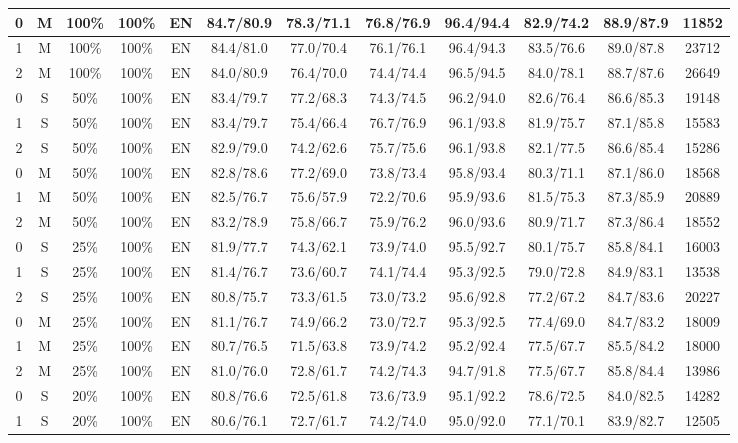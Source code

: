 \begin{table*}
{\begin{tabular}{|c|c|c|c|c||c|c|c|c|c|c||c|}
0 & M & 100\% & 100\% & EN & 84.7/80.9 & 78.3/71.1 & 76.8/76.9 & 96.4/94.4 & 82.9/74.2 & 88.9/87.9 & 11852 \\ \hline
1 & M & 100\% & 100\% & EN & 84.4/81.0 & 77.0/70.4 & 76.1/76.1 & 96.4/94.3 & 83.5/76.6 & 89.0/87.8 & 23712 \\ \hline
2 & M & 100\% & 100\% & EN & 84.0/80.9 & 76.4/70.0 & 74.4/74.4 & 96.5/94.5 & 84.0/78.1 & 88.7/87.6 & 26649 \\ \hline
0 & S & 50\% & 100\% & EN & 83.4/79.7 & 77.2/68.3 & 74.3/74.5 & 96.2/94.0 & 82.6/76.4 & 86.6/85.3 & 19148 \\ \hline
1 & S & 50\% & 100\% & EN & 83.4/79.7 & 75.4/66.4 & 76.7/76.9 & 96.1/93.8 & 81.9/75.7 & 87.1/85.8 & 15583 \\ \hline
2 & S & 50\% & 100\% & EN & 82.9/79.0 & 74.2/62.6 & 75.7/75.6 & 96.1/93.8 & 82.1/77.5 & 86.6/85.4 & 15286 \\ \hline
0 & M & 50\% & 100\% & EN & 82.8/78.6 & 77.2/69.0 & 73.8/73.4 & 95.8/93.4 & 80.3/71.1 & 87.1/86.0 & 18568 \\ \hline
1 & M & 50\% & 100\% & EN & 82.5/76.7 & 75.6/57.9 & 72.2/70.6 & 95.9/93.6 & 81.5/75.3 & 87.3/85.9 & 20889 \\ \hline
2 & M & 50\% & 100\% & EN & 83.2/78.9 & 75.8/66.7 & 75.9/76.2 & 96.0/93.6 & 80.9/71.7 & 87.3/86.4 & 18552 \\ \hline
0 & S & 25\% & 100\% & EN & 81.9/77.7 & 74.3/62.1 & 73.9/74.0 & 95.5/92.7 & 80.1/75.7 & 85.8/84.1 & 16003 \\ \hline
1 & S & 25\% & 100\% & EN & 81.4/76.7 & 73.6/60.7 & 74.1/74.4 & 95.3/92.5 & 79.0/72.8 & 84.9/83.1 & 13538 \\ \hline
2 & S & 25\% & 100\% & EN & 80.8/75.7 & 73.3/61.5 & 73.0/73.2 & 95.6/92.8 & 77.2/67.2 & 84.7/83.6 & 20227 \\ \hline
0 & M & 25\% & 100\% & EN & 81.1/76.7 & 74.9/66.2 & 73.0/72.7 & 95.3/92.5 & 77.4/69.0 & 84.7/83.2 & 18009 \\ \hline
1 & M & 25\% & 100\% & EN & 80.7/76.5 & 71.5/63.8 & 73.9/74.2 & 95.2/92.4 & 77.5/67.7 & 85.5/84.2 & 18000 \\ \hline
2 & M & 25\% & 100\% & EN & 81.0/76.0 & 72.8/61.7 & 74.2/74.3 & 94.7/91.8 & 77.5/67.7 & 85.8/84.4 & 13986 \\ \hline
0 & S & 20\% & 100\% & EN & 80.8/76.6 & 72.5/61.8 & 73.6/73.9 & 95.1/92.2 & 78.6/72.5 & 84.0/82.5 & 14282 \\ \hline
1 & S & 20\% & 100\% & EN & 80.6/76.1 & 72.7/61.7 & 74.2/74.0 & 95.0/92.0 & 77.1/70.1 & 83.9/82.7 & 12505 \\ \hline

\end{tabular}}
\end{table*}
